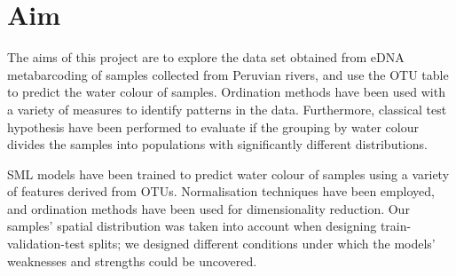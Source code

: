 
\section{Aim}

The aims of this project are to explore the data set obtained from eDNA metabarcoding of samples collected from Peruvian rivers, and use the OTU table to predict the water colour of samples. Ordination methods have been used with a variety of measures to identify patterns in the data. Furthermore, classical test hypothesis have been performed to evaluate if the grouping by water colour divides the samples into populations with significantly different distributions. 

SML models have been trained to predict water colour of samples using a variety of features derived from OTUs. Normalisation techniques have been employed, and ordination methods have been used for dimensionality reduction. Our samples' spatial distribution was taken into account when designing train-validation-test splits; we designed different conditions under which the models'  weaknesses and strengths could be uncovered.



